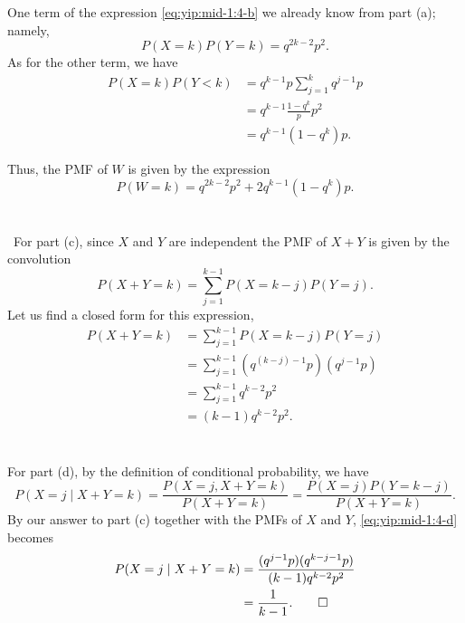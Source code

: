 \begin{solution*}
  One term of the expression \eqref{eq:yip:mid-1:4-b} we already know from
  part (a); namely,
  \[
    P(X=k)P(Y=k)=q^{2k-2}p^2.
  \]
  As for the other term, we have
  \begin{align*}
    P(X=k)P(Y<k)
    &=q^{k-1}p\sum_{j=1}^k q^{j-1}p\\
    &=q^{k-1}\frac{1-q^k}{p}p^2\\
    &=q^{k-1}(1-q^k)p.
  \end{align*}

  Thus, the PMF of \(W\) is given by the expression
  \[
    P(W=k)=q^{2k-2}p^2+2q^{k-1}(1-q^k)p.
  \]
  \\\\\
  For part (c), since \(X\) and \(Y\) are independent the PMF of \(X+Y\) is
  given by the convolution
  \[
    P(X+Y=k)=\sum_{j=1}^{k-1} P(X=k-j)P(Y=j).
  \]
  Let us find a closed form for this expression,
  \begin{align*}
    P(X+Y=k)
    &=\sum_{j=1}^{k-1} P(X=k-j) P(Y=j)\\
    &=\sum_{j=1}^{k-1} (q^{(k-j)-1}p) (q^{j-1}p)\\
    &=\sum_{j=1}^{k-1}q^{k-2}p^2\\
    &=(k-1)q^{k-2}p^2.
  \end{align*}
  \\\\
  For part (d), by the definition of conditional probability, we have
  \begin{equation}
    \label{eq:yip:mid-1:4-d}
    P(X=j\mid X+Y=k)=%
    \frac{P(X=j,X+Y=k)}{P(X+Y=k)}=%
    \frac{P(X=j)P(Y=k-j)}{P(X+Y=k)}.
  \end{equation}
  By our answer to part (c) together with the PMFs of \(X\) and \(Y\),
  \eqref{eq:yip:mid-1:4-d} becomes
  \begin{align*}
    P(X=j\mid X+Y=k)
    &=\frac{(q^{j-1}p)(q^{k-j-1}p)}{(k-1)q^{k-2}p^2}\\
    &=\frac{1}{k-1}.\qedhere
  \end{align*}
\end{solution*}

